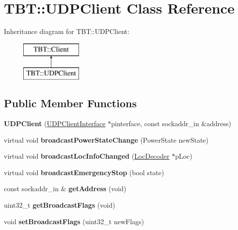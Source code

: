 \hypertarget{classTBT_1_1UDPClient}{}\section{T\+BT\+:\+:U\+D\+P\+Client Class Reference}
\label{classTBT_1_1UDPClient}
Inheritance diagram for T\+BT\+:\+:U\+D\+P\+Client\+:\begin{figure}[H]
\begin{center}
\leavevmode
\includegraphics[height=2.000000cm]{classTBT_1_1UDPClient}
\end{center}
\end{figure}
\subsection*{Public Member Functions}
\begin{DoxyCompactItemize}
\item 
\mbox{\label{classTBT_1_1UDPClient_a7b6f7858b9d3a7243bdd48fbf150b9f8}} 
{\bfseries U\+D\+P\+Client} (\hyperlink{classTBT_1_1UDPClientInterface}{U\+D\+P\+Client\+Interface} $\ast$pinterface, const sockaddr\+\_\+in \&address)
\item 
\mbox{\label{classTBT_1_1UDPClient_aaf8b77e98494585ea3c44c9e89ec04ec}} 
virtual void {\bfseries broadcast\+Power\+State\+Change} (Power\+State new\+State)
\item 
\mbox{\label{classTBT_1_1UDPClient_a90c650259501f341f531ede72210624a}} 
virtual void {\bfseries broadcast\+Loc\+Info\+Changed} (\hyperlink{classTBT_1_1LocDecoder}{Loc\+Decoder} $\ast$p\+Loc)
\item 
\mbox{\label{classTBT_1_1UDPClient_aad30cea06b570b6a5e688710cfd53100}} 
virtual void {\bfseries broadcast\+Emergency\+Stop} (bool state)
\item 
\mbox{\label{classTBT_1_1UDPClient_a8471b71655c61bf074b70b62a6dffbf1}} 
const sockaddr\+\_\+in \& {\bfseries get\+Address} (void)
\item 
\mbox{\label{classTBT_1_1UDPClient_a18da0bdc657f707f4c0af6cd3b1e6031}} 
uint32\+\_\+t {\bfseries get\+Broadcast\+Flags} (void)
\item 
\mbox{\label{classTBT_1_1UDPClient_a23a0b0ecf47f8a2fe018a570f46ecdfe}} 
void {\bfseries set\+Broadcast\+Flags} (uint32\+\_\+t new\+Flags)
\end{DoxyCompactItemize}
